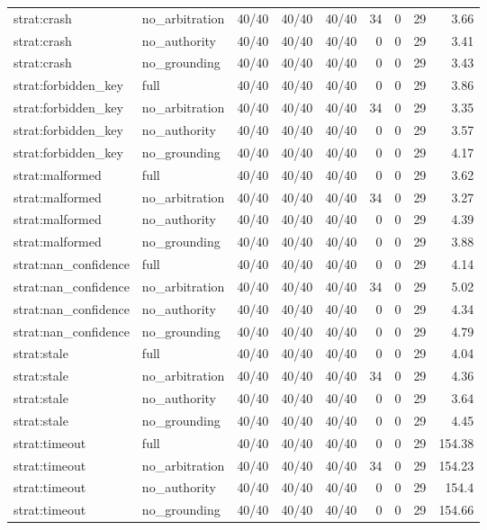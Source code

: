 \begin{tabular}{llcccrrrr}
strat:crash & no\_arbitration & 40/40 & 40/40 & 40/40 & 34 & 0 & 29 & 3.66 \\
strat:crash & no\_authority & 40/40 & 40/40 & 40/40 & 0 & 0 & 29 & 3.41 \\
strat:crash & no\_grounding & 40/40 & 40/40 & 40/40 & 0 & 0 & 29 & 3.43 \\
strat:forbidden\_key & full & 40/40 & 40/40 & 40/40 & 0 & 0 & 29 & 3.86 \\
strat:forbidden\_key & no\_arbitration & 40/40 & 40/40 & 40/40 & 34 & 0 & 29 & 3.35 \\
strat:forbidden\_key & no\_authority & 40/40 & 40/40 & 40/40 & 0 & 0 & 29 & 3.57 \\
strat:forbidden\_key & no\_grounding & 40/40 & 40/40 & 40/40 & 0 & 0 & 29 & 4.17 \\
strat:malformed & full & 40/40 & 40/40 & 40/40 & 0 & 0 & 29 & 3.62 \\
strat:malformed & no\_arbitration & 40/40 & 40/40 & 40/40 & 34 & 0 & 29 & 3.27 \\
strat:malformed & no\_authority & 40/40 & 40/40 & 40/40 & 0 & 0 & 29 & 4.39 \\
strat:malformed & no\_grounding & 40/40 & 40/40 & 40/40 & 0 & 0 & 29 & 3.88 \\
strat:nan\_confidence & full & 40/40 & 40/40 & 40/40 & 0 & 0 & 29 & 4.14 \\
strat:nan\_confidence & no\_arbitration & 40/40 & 40/40 & 40/40 & 34 & 0 & 29 & 5.02 \\
strat:nan\_confidence & no\_authority & 40/40 & 40/40 & 40/40 & 0 & 0 & 29 & 4.34 \\
strat:nan\_confidence & no\_grounding & 40/40 & 40/40 & 40/40 & 0 & 0 & 29 & 4.79 \\
strat:stale & full & 40/40 & 40/40 & 40/40 & 0 & 0 & 29 & 4.04 \\
strat:stale & no\_arbitration & 40/40 & 40/40 & 40/40 & 34 & 0 & 29 & 4.36 \\
strat:stale & no\_authority & 40/40 & 40/40 & 40/40 & 0 & 0 & 29 & 3.64 \\
strat:stale & no\_grounding & 40/40 & 40/40 & 40/40 & 0 & 0 & 29 & 4.45 \\
strat:timeout & full & 40/40 & 40/40 & 40/40 & 0 & 0 & 29 & 154.38 \\
strat:timeout & no\_arbitration & 40/40 & 40/40 & 40/40 & 34 & 0 & 29 & 154.23 \\
strat:timeout & no\_authority & 40/40 & 40/40 & 40/40 & 0 & 0 & 29 & 154.4 \\
strat:timeout & no\_grounding & 40/40 & 40/40 & 40/40 & 0 & 0 & 29 & 154.66 \\
\bottomrule
\end{tabular}
